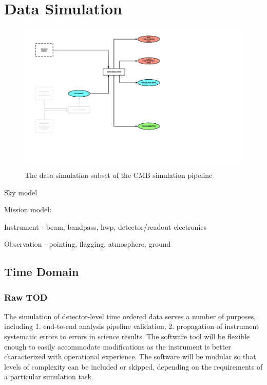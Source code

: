  
\section{Data Simulation}

\begin{figure}[htbp]
\centering
\includegraphics[width=1\textwidth]{Analysis/ds}
\caption{The data simulation subset of the CMB simulation pipeline}
\label{fig:skymodel-in-pipeline}
\end{figure}


Sky model

Mission model:

Instrument - beam, bandpass, hwp, detector/readout electronics

Observation - pointing, flagging, atmosphere, ground

\subsection{Time Domain}

\subsubsection{Raw TOD}

The simulation of detector-level time ordered data serves a number of purposes, including 1.  end-to-end analysis pipeline validation, 2.  propagation of instrument systematic errors to errors in science results.  The software tool will be flexible enough to easily accommodate modifications as the instrument is better characterized with operational experience.  The software will be modular so that levels of complexity can be included or skipped, depending on the requirements of a particular simulation task.

